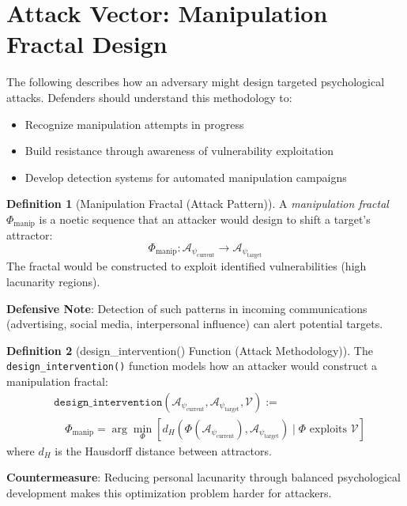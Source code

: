 \documentclass[11pt,twoside]{book}
\theoremstyle{definition}
\newtheorem{definition}{Definition}[chapter]
\theoremstyle{plain}
\theoremstyle{remark}
\newcommand{\Frac}{\Phi}
\newcommand{\PsychAttractor}{\mathcal{A}_\psi}
\newcommand{\ManipFrac}{\Phi_{\mathrm{manip}}}
\newcommand{\VulnScore}{\mathcal{V}}
\begin{document}
\section{Attack Vector: Manipulation Fractal Design}

\begin{tcolorbox}[colback=orange!5!white,colframe=orange!75!black,title=\textbf{Threat Model: Attacker's Manipulation Strategy},breakable]
The following describes how an adversary might design targeted psychological attacks. Defenders should understand this methodology to:
\begin{itemize}
    \item Recognize manipulation attempts in progress
    \item Build resistance through awareness of vulnerability exploitation
    \item Develop detection systems for automated manipulation campaigns
\end{itemize}
\end{tcolorbox}

\begin{definition}[Manipulation Fractal (Attack Pattern)]
\label{def:manip-frac}
A \emph{manipulation fractal} $\ManipFrac$ is a noetic sequence that an attacker would design to shift a target's attractor:
\[
    \ManipFrac : \PsychAttractor_{\mathrm{current}} \to \PsychAttractor_{\mathrm{target}}
\]
The fractal would be constructed to exploit identified vulnerabilities (high lacunarity regions).

\textbf{Defensive Note}: Detection of such patterns in incoming communications (advertising, social media, interpersonal influence) can alert potential targets.
\end{definition}

\begin{definition}[design\_intervention() Function (Attack Methodology)]
\label{def:design-intervention}
The \texttt{design\_intervention()} function models how an attacker would construct a manipulation fractal:
\[
\boxed{
\begin{aligned}
    &\mathtt{design\_intervention}(\PsychAttractor_{\mathrm{current}}, \PsychAttractor_{\mathrm{target}}, \VulnScore) := \\
    &\quad \ManipFrac = \arg\min_{\Frac} \left[ d_H(\Frac(\PsychAttractor_{\mathrm{current}}), \PsychAttractor_{\mathrm{target}})
    \;\Big|\; \Frac \text{ exploits } \VulnScore \right]
\end{aligned}
}
\]
where $d_H$ is the Hausdorff distance between attractors.

\textbf{Countermeasure}: Reducing personal lacunarity through balanced psychological development makes this optimization problem harder for attackers.
\end{definition}
\end{document}
